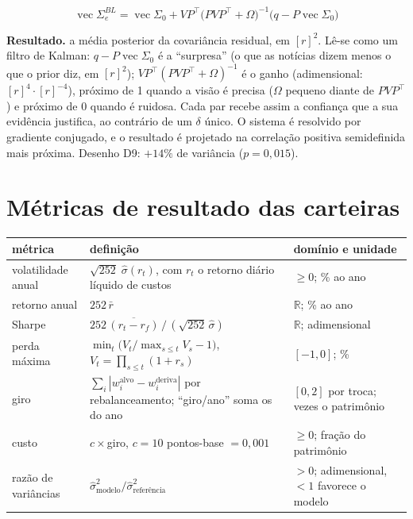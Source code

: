 \documentclass[11pt,a4paper]{article}
\newcommand{\resultado}[1]{\par\textbf{Resultado.} #1}
\newcommand{\R}{\mathbb R}
\newcommand{\ur}{[r]}           %
\begin{document}
\begin{equation}
  \operatorname{vec}\Sigma_e^{BL} = \operatorname{vec}\Sigma_0
  + VP^\top\bigl(PVP^\top+\Omega\bigr)^{-1}\bigl(q-P\operatorname{vec}\Sigma_0\bigr)
  \tag{3.11}
\end{equation}

\resultado{a média posterior da covariância residual, em $\ur^2$. Lê-se como um filtro de Kalman:
$q-P\operatorname{vec}\Sigma_0$ é a ``surpresa'' (o que as notícias dizem menos o que o prior diz, em
$\ur^2$); $VP^\top(PVP^\top+\Omega)^{-1}$ é o ganho (adimensional: $\ur^4\cdot\ur^{-4}$), próximo de 1
quando a visão é precisa ($\Omega$ pequeno diante de $PVP^\top$) e próximo de 0 quando é ruidosa. Cada par
recebe assim a confiança que a sua evidência justifica, ao contrário de um $\delta$ único. O sistema é
resolvido por gradiente conjugado, e o resultado é projetado na correlação positiva semidefinida mais
próxima. Desenho D9: $+14\%$ de variância ($p=0{,}015$).}

\section{Métricas de resultado das carteiras}

\begin{center}
\small
\begin{tabularx}{\textwidth}{>{\raggedright\arraybackslash}p{2.6cm}>{\raggedright\arraybackslash}X>{\raggedright\arraybackslash}p{2.9cm}}
\toprule
métrica & definição & domínio e unidade \\
\midrule
volatilidade anual & $\sqrt{252}\;\hat\sigma(r_t)$, com $r_t$ o retorno diário líquido de custos & $\ge0$; \% ao ano \\
retorno anual & $252\,\bar r$ & $\R$; \% ao ano \\
Sharpe & $252\,\overline{(r_t-r_f)}\,/\,(\sqrt{252}\,\hat\sigma)$ & $\R$; adimensional \\
perda máxima & $\min_t\bigl(V_t/\max_{s\le t}V_s-1\bigr)$, $V_t=\prod_{s\le t}(1+r_s)$ & $[-1,0]$; \% \\
giro & $\sum_i|w_i^{\mathrm{alvo}}-w_i^{\mathrm{deriva}}|$ por rebalanceamento; ``giro/ano'' soma os do ano & $[0,2]$ por troca; vezes o patrimônio \\
custo & $c\times$giro, $c=10$ pontos-base $=0{,}001$ & $\ge0$; fração do patrimônio \\
razão de variâncias & $\hat\sigma^2_{\text{modelo}}/\hat\sigma^2_{\text{referência}}$ & $>0$; adimensional, $<1$ favorece o modelo \\
\bottomrule
\end{tabularx}
\end{center}
\end{document}
